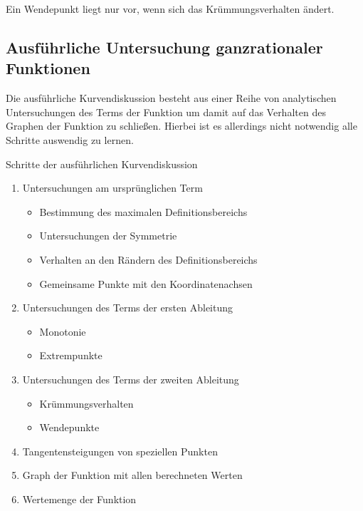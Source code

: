 \begin{b8d}{}{}
Ein Wendepunkt liegt nur vor, wenn sich das Krümmungsverhalten ändert.
\end{b8d}
\subsection{Ausführliche Untersuchung ganzrationaler Funktionen} 
Die ausführliche Kurvendiskussion besteht aus einer Reihe von analytischen Untersuchungen des Terms der Funktion um damit auf das Verhalten des Graphen der Funktion zu schließen. Hierbei ist es allerdings nicht notwendig alle Schritte auswendig zu lernen.
\begin{merke}{Schritte der ausführlichen Kurvendiskussion}{}
\begin{enumerate}
    \item Untersuchungen am ursprünglichen Term
    \begin{itemize}
        \item Bestimmung des maximalen Definitionsbereichs
        \item Untersuchungen der Symmetrie
        \item Verhalten an den Rändern des Definitionsbereichs 
        \item Gemeinsame Punkte mit den Koordinatenachsen
    \end{itemize}
    \item Untersuchungen des Terms der ersten Ableitung
        \begin{itemize}
            \item Monotonie
            \item Extrempunkte

        \end{itemize}
    \item Untersuchungen des Terms der zweiten Ableitung
        \begin{itemize}
            \item Krümmungsverhalten
            \item Wendepunkte
              \end{itemize}
    \item Tangentensteigungen von speziellen Punkten
      
    \item Graph der Funktion mit allen berechneten Werten
    \item Wertemenge der Funktion
\end{enumerate}
\end{merke}

